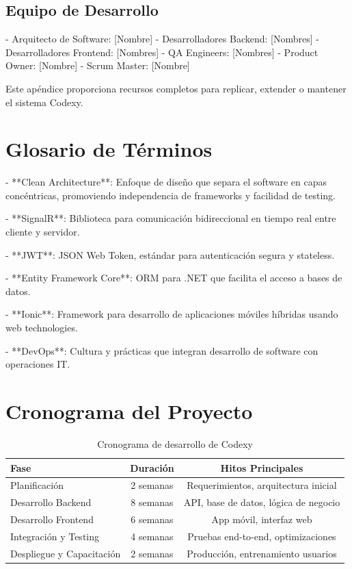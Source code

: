 \subsection{Equipo de Desarrollo}
- Arquitecto de Software: [Nombre]
- Desarrolladores Backend: [Nombres]
- Desarrolladores Frontend: [Nombres]
- QA Engineers: [Nombres]
- Product Owner: [Nombre]
- Scrum Master: [Nombre]

Este apéndice proporciona recursos completos para replicar, extender o mantener el sistema Codexy.

\section{Glosario de Términos}

- **Clean Architecture**: Enfoque de diseño que separa el software en capas concéntricas, promoviendo independencia de frameworks y facilidad de testing.

- **SignalR**: Biblioteca para comunicación bidireccional en tiempo real entre cliente y servidor.

- **JWT**: JSON Web Token, estándar para autenticación segura y stateless.

- **Entity Framework Core**: ORM para .NET que facilita el acceso a bases de datos.

- **Ionic**: Framework para desarrollo de aplicaciones móviles híbridas usando web technologies.

- **DevOps**: Cultura y prácticas que integran desarrollo de software con operaciones IT.

\section{Cronograma del Proyecto}

\begin{table}[htbp]
\centering
\caption{Cronograma de desarrollo de Codexy}
\label{tab:timeline}
\begin{tabular}{|l|c|c|}
\hline
\textbf{Fase} & \textbf{Duración} & \textbf{Hitos Principales} \\
\hline
Planificación & 2 semanas & Requerimientos, arquitectura inicial \\
\hline
Desarrollo Backend & 8 semanas & API, base de datos, lógica de negocio \\
\hline
Desarrollo Frontend & 6 semanas & App móvil, interfaz web \\
\hline
Integración y Testing & 4 semanas & Pruebas end-to-end, optimizaciones \\
\hline
Despliegue y Capacitación & 2 semanas & Producción, entrenamiento usuarios \\
\hline
\end{tabular}
\end{table}

